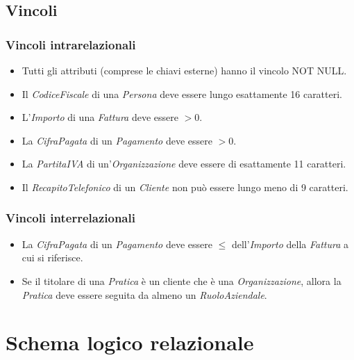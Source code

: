 \documentclass[a4paper,12pt]{article}
\begin{document}
 \subsection{ Vincoli }

\subsubsection{ Vincoli intrarelazionali }

\begin{itemize}
\item Tutti gli attributi (comprese le chiavi esterne) hanno il vincolo NOT NULL.

\item Il \textit{CodiceFiscale} di una \textit{Persona} deve essere lungo esattamente 16 caratteri.

\item L'\textit{Importo} di una \textit{Fattura} deve essere $> 0$.

\item La \textit{CifraPagata} di un \textit{Pagamento} deve essere $> 0$.

\item La \textit{PartitaIVA} di un'\textit{Organizzazione} deve essere di esattamente 11 caratteri.

\item Il \textit{RecapitoTelefonico} di un \textit{Cliente} non può essere lungo meno di 9 caratteri.
\end{itemize}

\subsubsection{ Vincoli interrelazionali }

\begin{itemize}
\item La \textit{CifraPagata} di un \textit{Pagamento} deve essere $\leq$ dell'\textit{Importo} della \textit{Fattura} a cui si riferisce.

\item Se il titolare di una \textit{Pratica} è un cliente che è una \textit{Organizzazione}, allora la \textit{Pratica} deve essere seguita da almeno un \textit{RuoloAziendale}.
\end{itemize}

 \section{ Schema logico relazionale }
\end{document}
